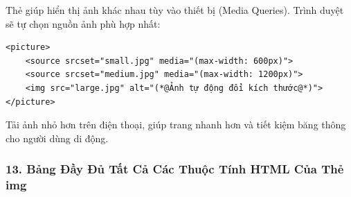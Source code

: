 Thẻ  giúp hiển thị ảnh khác nhau tùy vào thiết bị (Media Queries). Trình duyệt sẽ tự chọn nguồn ảnh phù hợp nhất:

\begin{codeWindow}
\begin{lstlisting}[language=HTML5]
<picture>
    <source srcset="small.jpg" media="(max-width: 600px)">
    <source srcset="medium.jpg" media="(max-width: 1200px)">
    <img src="large.jpg" alt="(*@Ảnh tự động đổi kích thước@*)">
</picture>
\end{lstlisting}
\end{codeWindow}

\begin{tipBox}
Tải ảnh nhỏ hơn trên điện thoại, giúp trang nhanh hơn và tiết kiệm băng thông cho người dùng di động.
\end{tipBox}

\subsubsection{13. Bảng Đầy Đủ Tất Cả Các Thuộc Tính HTML Của Thẻ img}

